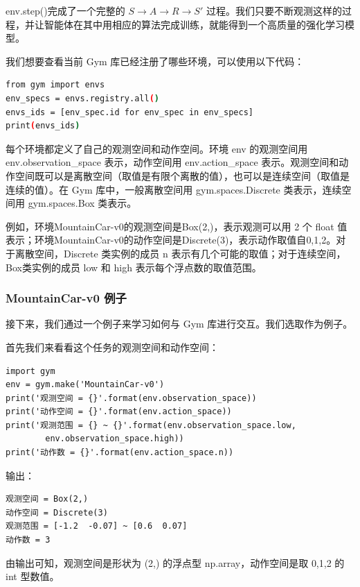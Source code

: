 env.step()完成了一个完整的 $S \to A \to R \to S'$ 过程。我们只要不断观测这样的过程，并让智能体在其中用相应的算法完成训练，就能得到一个高质量的强化学习模型。

我们想要查看当前 Gym 库已经注册了哪些环境，可以使用以下代码：
\begin{lstlisting}[language=sh,basicstyle=\zihao{-5}\ttfamily]
from gym import envs
env_specs = envs.registry.all()
envs_ids = [env_spec.id for env_spec in env_specs]
print(envs_ids)
\end{lstlisting}

每个环境都定义了自己的观测空间和动作空间。环境 env 的观测空间用 env.observation\_space 表示，动作空间用 env.action\_space 表示。观测空间和动作空间既可以是离散空间（取值是有限个离散的值），也可以是连续空间（取值是连续的值）。在 Gym 库中，一般离散空间用 gym.spaces.Discrete 类表示，连续空间用 gym.spaces.Box 类表示。

例如，环境MountainCar-v0的观测空间是Box(2,)，表示观测可以用  2  个 float 值表示；环境MountainCar-v0的动作空间是Discrete(3)，表示动作取值自{0,1,2}。对于离散空间，Discrete 类实例的成员 n 表示有几个可能的取值；对于连续空间，Box类实例的成员 low 和 high 表示每个浮点数的取值范围。

\subsubsection{MountainCar-v0 例子}

接下来，我们通过一个例子来学习如何与 Gym 库进行交互。我们选取作为例子。

首先我们来看看这个任务的观测空间和动作空间：
\begin{lstlisting}[style=Python]
import gym
env = gym.make('MountainCar-v0')
print('观测空间 = {}'.format(env.observation_space))
print('动作空间 = {}'.format(env.action_space))
print('观测范围 = {} ~ {}'.format(env.observation_space.low,
        env.observation_space.high))
print('动作数 = {}'.format(env.action_space.n))
\end{lstlisting}

输出：

\begin{lstlisting}[basicstyle=\zihao{-5}\ttfamily]
观测空间 = Box(2,)
动作空间 = Discrete(3)
观测范围 = [-1.2  -0.07] ~ [0.6  0.07]
动作数 = 3    
\end{lstlisting}


由输出可知，观测空间是形状为 (2,) 的浮点型 np.array，动作空间是取 {0,1,2} 的 int 型数值。

